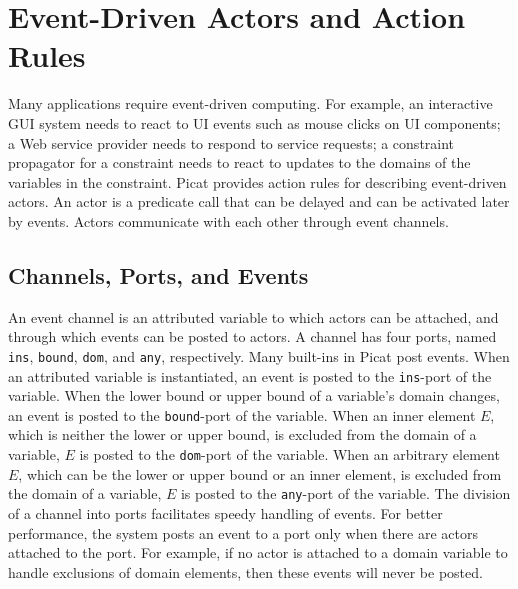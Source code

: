 \chapter{\label{ch:actors}Event-Driven Actors and Action Rules}
Many applications require event-driven computing. For example, an interactive GUI system needs to react to UI events such as mouse clicks on UI components; a Web service provider needs to respond to service requests; a constraint propagator for a constraint needs to react to updates to the domains of the variables in the constraint. Picat provides action rules for describing event-driven actors. An actor is a predicate call that can be delayed and can be activated later by events. Actors communicate with each other through event channels. 

\section{Channels, Ports, and Events}
An event channel is an attributed variable to which actors can be attached, and through which events can be posted to actors. A channel has four ports, named \texttt{ins}, \texttt{bound}, \texttt{dom}, and \texttt{any}, respectively. Many built-ins in Picat post events. When an attributed variable is instantiated, an event is posted to the \texttt{ins}-port of the variable. When the lower bound or upper bound of a variable's domain changes, an event  is posted to the \texttt{bound}-port of the variable. When an inner element $E$, which is neither the lower or upper bound, is excluded from the domain of a variable, $E$ is posted to the \texttt{dom}-port of the variable. When an arbitrary element $E$, which can be the lower or upper bound or an inner element, is excluded from the domain of a variable, $E$ is posted to the \texttt{any}-port of the variable. The division of a channel into ports facilitates speedy handling of events. For better performance, the system posts an event to a port only when there are actors attached to the port. For example, if no actor is attached to a domain variable to handle exclusions of domain elements, then these events will never be posted.

